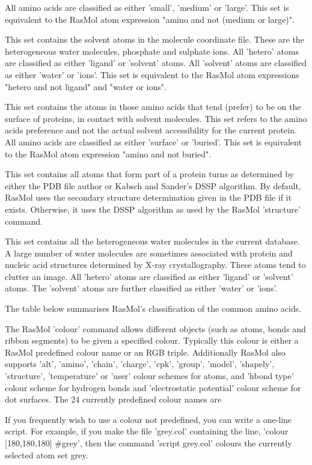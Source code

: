All amino acids are classified as either
'small',
'medium'
or
'large'.
This set is equivalent to the RasMol atom expression
"amino and not (medium or large)".

This set contains the solvent atoms in the molecule coordinate file.
These are the heterogeneous water molecules, phosphate and sulphate
ions. All
'hetero'
atoms are classified as either
'ligand'
or
'solvent'
atoms. All
'solvent'
atoms are classified as either
'water'
or
'ions'.
This set is equivalent to the RasMol atom expressions
"hetero and not ligand"
and
"water or ions".

This set contains the atoms in those amino acids that tend
(prefer) to be on the surface of proteins, in contact with
solvent molecules. This set refers to the amino acids
preference and not the actual solvent accessibility for
the current protein.
All amino acids are classified as either
'surface'
or
'buried'.
This set is equivalent to the RasMol atom expression
"amino and not buried".

This set contains all atoms that form part of a protein turns
as determined by either the PDB file author or Kabsch and
Sander's DSSP algorithm. By default, RasMol uses the secondary
structure determination given in the PDB file if it exists.
Otherwise, it uses the DSSP algorithm as used by the RasMol
'structure'
command.

This set contains all the heterogeneous water molecules in the current
database. A large number of water molecules are sometimes associated
with protein and nucleic acid structures determined by X-ray
crystallography. These atoms tend to clutter an image.
All
'hetero'
atoms are classified as either
'ligand'
or
'solvent'
atoms. The
'solvent'
atoms are further classified as either
'water'
or
'ions'.

The table below summarises RasMol's classification of the common amino acids.

The RasMol
'colour'
command allows different objects (such as atoms, bonds and ribbon segments)
to be given a specified colour. Typically this colour is either a RasMol
predefined colour name or an RGB triple. Additionally RasMol also supports
'alt',
'amino',
'chain',
'charge',
'cpk',
'group',
'model',
'shapely',
'structure',
'temperature'
or
'user'
colour schemes for atoms, and
'hbond type'
colour scheme for hydrogen bonds and
'electrostatic potential'
colour scheme for dot surfaces.
The 24 currently predefined colour
names are

If you frequently wish to use a colour not predefined, you can write
a one-line script. For example, if you make the file
'grey.col'
containing the line,
'colour [180,180,180] #grey',
then the command
'script grey.col'
colours the currently selected atom set grey.

